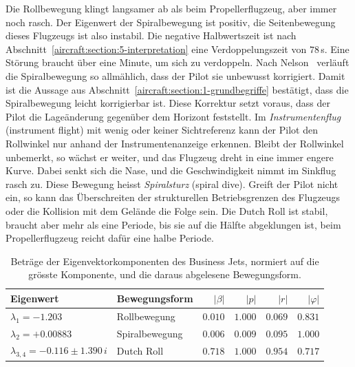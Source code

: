 Die Rollbewegung klingt langsamer ab als beim Propellerflugzeug, aber immer
noch rasch.
Der Eigenwert der Spiralbewegung ist positiv, die Seitenbewegung dieses
Flugzeugs ist also instabil.
Die negative Halbwertszeit ist nach
Abschnitt~\ref{aircraft:section:5-interpretation} eine Verdoppelungszeit
von $78$\,s.
Eine Störung braucht über eine Minute, um sich zu verdoppeln.
Nach Nelson~\cite[Abschnitt 5.1]{aircraft:nelson} verläuft die
Spiralbewegung so allmählich, dass der Pilot sie unbewusst korrigiert.
Damit ist die Aussage aus Abschnitt~\ref{aircraft:section:1-grundbegriffe}
bestätigt, dass die Spiralbewegung leicht korrigierbar ist.
Diese Korrektur setzt voraus, dass der Pilot die Lageänderung gegenüber dem
Horizont feststellt.
Im \emph{Instrumentenflug} (instrument flight) mit wenig oder keiner
%
Sichtreferenz kann der Pilot den Rollwinkel nur anhand der
Instrumentenanzeige erkennen.
Bleibt der Rollwinkel unbemerkt, so wächst er weiter, und das
Flugzeug dreht in eine immer engere Kurve.
Dabei senkt sich die Nase, und die Geschwindigkeit nimmt im Sinkflug
rasch zu.
Diese Bewegung heisst \emph{Spiralsturz} (spiral dive).
%
Greift der Pilot nicht ein, so kann das Überschreiten der strukturellen
Betriebsgrenzen des Flugzeugs oder die Kollision mit dem Gelände die Folge sein.
Die Dutch Roll ist stabil, braucht aber mehr als eine Periode, bis sie auf
die Hälfte abgeklungen ist, beim Propellerflugzeug reicht dafür eine halbe
Periode.

\begin{table}
    \centering
    \begin{tabular}{llrrrr}
        \hline
        Eigenwert & Bewegungsform & $|\beta|$ & $|p|$ & $|r|$ & $|\varphi|$ \\
        \hline
        $\lambda_1 = -1.203$                  & Rollbewegung   & $0.010$
        & $1.000$ & $0.069$ & $0.831$ \\
        $\lambda_2 = +0.00883$                & Spiralbewegung & $0.006$
        & $0.009$ & $0.095$ & $1.000$ \\
        $\lambda_{3,4} = -0.116 \pm 1.390\,i$ & Dutch Roll     & $0.718$
        & $1.000$ & $0.954$ & $0.717$ \\
        \hline
    \end{tabular}
    \caption{Beträge der Eigenvektorkomponenten des Business Jets,
        normiert auf die grösste Komponente, und die daraus abgelesene
        Bewegungsform.
        \label{aircraft:table:eigenvektoren-bizjet}}
\end{table}

